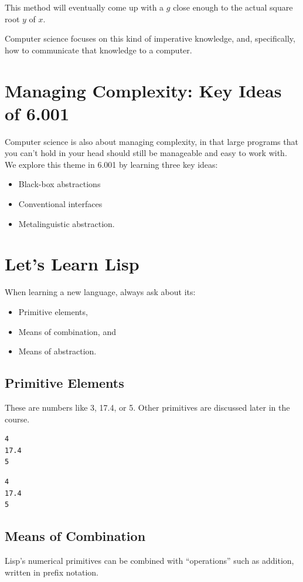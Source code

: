 \documentclass[9pt]{report}
\begin{document}
This method will eventually come up with a \(g\) close enough to the
actual square root \(y\) of \(x\).

Computer science focuses on this kind of imperative knowledge, and,
specifically, how to communicate that knowledge to a computer.

\section{Managing Complexity: Key Ideas of 6.001}
\label{sec:org0dee81e}
Computer science is also about managing complexity, in that large
programs that you can't hold in your head should still be manageable
and easy to work with. We explore this theme in 6.001 by learning
three key ideas:

\begin{itemize}
\item Black-box abstractions
\item Conventional interfaces
\item Metalinguistic abstraction.
\end{itemize}


\section{Let's Learn Lisp}
\label{sec:org89ccebe}
When learning a new language, always ask about its:
\begin{itemize}
\item Primitive elements,
\item Means of combination, and
\item Means of abstraction.
\end{itemize}

\subsection{Primitive Elements}
\label{sec:orgec2415f}
These are numbers like 3, 17.4, or 5. Other primitives are
discussed later in the course.

\begin{verbatim}
4
17.4
5
\end{verbatim}

\begin{verbatim}
4
17.4
5
\end{verbatim}

\subsection{Means of Combination}
\label{sec:org47bbf36}
Lisp's numerical primitives can be combined with ``operations'' such
as addition, written in prefix notation.
\end{document}
